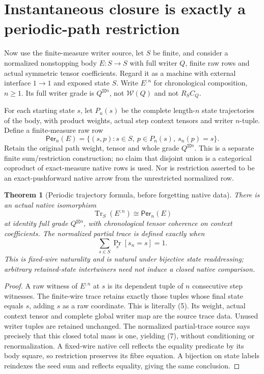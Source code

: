 \documentclass[11pt]{article}
\newtheorem{theorem}{Theorem}\newtheorem{proposition}[theorem]{Proposition}
\begin{document}
\section{Instantaneous closure is exactly a periodic-path restriction}
Now use the finite-measure writer source, let $S$ be finite, and consider a normalized nonstopping body $E:S\to S$ with full writer $Q$, finite raw rows and actual symmetric tensor coefficients. Regard it as a machine with external interface $1\to1$ and exposed state $S$. Write $E^{;n}$ for chronological composition, $n\geq1$. Its full writer grade is $Q^{\boxtimes n}$, not $\mathcal W(Q)$ and not $R_SC_Q$.

For each starting state $s$, let $P_n(s)$ be the complete length-$n$ state trajectories of the body, with product weights, actual step context tensors and writer $n$-tuple. Define a finite-measure raw row
\[
 \mathsf{Per}_n(E)=\{(s,p):s\in S,\ p\in P_n(s),\ s_n(p)=s\}.       \tag{5}
\]
Retain the original path weight, tensor and whole grade $Q^{\boxtimes n}$. This is a separate finite sum/restriction construction; no claim that disjoint union is a categorical coproduct of exact-measure native rows is used. Nor is restriction asserted to be an exact-pushforward native arrow from the unrestricted normalized row.

\begin{theorem}[Periodic trajectory formula, before forgetting native data]
There is an actual native isomorphism
\[
 \operatorname{Tr}_S(E^{;n})\cong \mathsf{Per}_n(E)          \tag{6}
\]
at identity full grade $Q^{\boxtimes n}$, with chronological tensor coherence on context coefficients. The normalized partial trace is defined exactly when
\[
 \sum_{s\in S}\Pr_s[s_n=s]=1.                            \tag{7}
\]
This is fixed-wire naturality and is natural under bijective state readdressing; arbitrary retained-state intertwiners need not induce a closed native comparison.
\end{theorem}
\begin{proof}
A raw witness of $E^{;n}$ at $s$ is its dependent tuple of $n$ consecutive step witnesses. The finite-wire trace retains exactly those tuples whose final state equals $s$, adding $s$ as a raw coordinate. This is literally (5). Its weight, actual context tensor and complete global writer map are the source trace data. Unused writer tuples are retained unchanged. The normalized partial-trace source says precisely that this closed total mass is one, yielding (7), without conditioning or renormalization. A fixed-wire native cell reflects the equality predicate by its body square, so restriction preserves its fibre equation. A bijection on state labels reindexes the seed sum and reflects equality, giving the same conclusion.
\end{proof}
\end{document}
